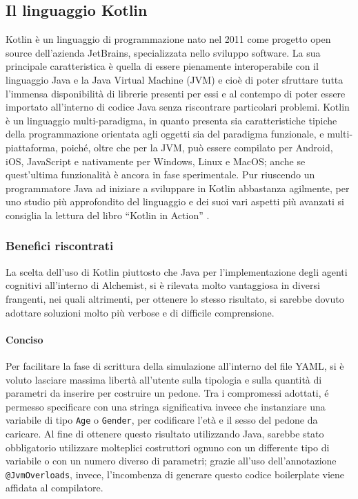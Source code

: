 \subsection{Il linguaggio Kotlin}
Kotlin è un linguaggio di programmazione nato nel 2011 come progetto open source dell'azienda JetBrains, specializzata nello sviluppo software. \newline
La sua principale caratteristica è quella di essere pienamente interoperabile con il linguaggio Java e la Java Virtual Machine (JVM) e cioè di poter sfruttare tutta l'immensa disponibilità di librerie presenti per essi e al contempo di poter essere importato all'interno di codice Java senza riscontrare particolari problemi. \newline
Kotlin è un linguaggio multi-paradigma, in quanto presenta sia caratteristiche tipiche della programmazione orientata agli oggetti sia del paradigma funzionale, e multi-piattaforma, poiché, oltre che per la JVM, può essere compilato per Android, iOS, JavaScript e nativamente per Windows, Linux e MacOS; anche se quest'ultima funzionalità è ancora in fase sperimentale. \newline
Pur riuscendo un programmatore Java ad iniziare a sviluppare in Kotlin abbastanza agilmente, per uno studio più approfondito del linguaggio e dei suoi vari aspetti più avanzati si consiglia la lettura del libro \enquote{Kotlin in Action} \cite{Jemerov2017}.

\subsubsection{Benefici riscontrati}
La scelta dell'uso di Kotlin piuttosto che Java per l'implementazione degli agenti cognitivi all'interno di Alchemist, si è rilevata molto vantaggiosa in diversi frangenti, nei quali altrimenti, per ottenere lo stesso risultato, si sarebbe dovuto adottare soluzioni molto più verbose e di difficile comprensione.

\paragraph{Conciso} Per facilitare la fase di scrittura della simulazione all'interno del file YAML, si è voluto lasciare massima libertà all'utente sulla tipologia e sulla quantità di parametri da inserire per costruire un pedone. Tra i compromessi adottati, é permesso specificare con una stringa significativa invece che instanziare una variabile di tipo \texttt{Age} o \texttt{Gender}, per codificare l'età e il sesso del pedone da caricare.  \newline
Al fine di ottenere questo risultato utilizzando Java, sarebbe stato obbligatorio utilizzare molteplici costruttori ognuno con un differente tipo di variabile o con un numero diverso di parametri; grazie all'uso dell'annotazione \texttt{@JvmOverloads}, invece, l'incombenza di generare questo codice boilerplate viene affidata al compilatore.

